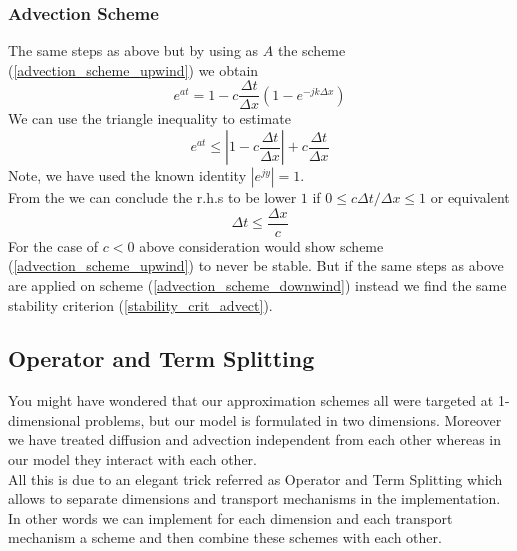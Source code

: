 \documentclass[]{article}
\begin{document}
\subsubsection{Advection Scheme}
The same steps as above but by using as $A$ the scheme (\ref{advection_scheme_upwind}) we obtain
\begin{equation*}
e^{at}=1-c\frac{\Delta t}{\Delta x}\left(1-e^{-jk\Delta x}\right)
\end{equation*}
We can use the triangle inequality to estimate
\begin{equation*}
e^{at}\leq \left|1-c\frac{\Delta t}{\Delta x}\right| + c\frac{\Delta t}{\Delta x}
\end{equation*}
Note, we have used the known identity $|e^{jy}|=1$.\\
From the we can conclude the r.h.s to be lower $1$ if $0\leq c\Delta t/\Delta x\leq 1$ or equivalent
\begin{equation} \label{stability_crit_advect}
\Delta t\leq \frac{\Delta x}{c}
\end{equation}
For the case of $c<0$ above consideration would show scheme (\ref{advection_scheme_upwind}) to never be stable. But if the same steps as above are applied on scheme (\ref{advection_scheme_downwind}) instead we find the same stability criterion (\ref{stability_crit_advect}).

\subsection{Operator and Term Splitting}
You might have wondered that our approximation schemes all were targeted at 1-dimensional problems, but our model is formulated in two dimensions. Moreover
we have treated diffusion and advection independent from each other whereas in our
model they interact with each other.\\
All this is due to an elegant trick referred as Operator and Term Splitting which allows to separate dimensions and transport mechanisms in the implementation. In other words we can implement for each dimension and each
transport mechanism a scheme and then combine these schemes with each other.\\
\end{document}

